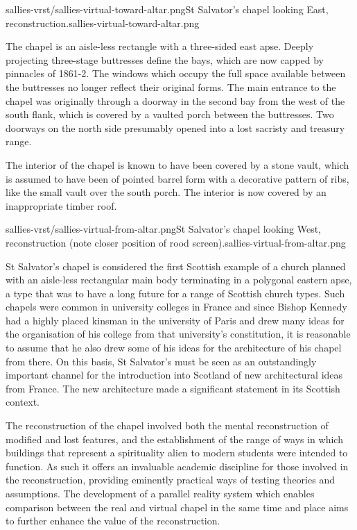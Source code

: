        {sallies-vrst/sallies-virtual-toward-altar.png}{St Salvator's chapel looking East, reconstruction.}{sallies-virtual-toward-altar.png}

The chapel is an aisle-less rectangle with a three-sided east apse. Deeply projecting three-stage buttresses define the bays, which are now capped by pinnacles of 1861-2. The windows which occupy the full space available between the buttresses no longer reflect their original forms. The main entrance to the chapel was originally through a doorway in the second bay from the west of the south flank, which is covered by a vaulted porch between the buttresses. Two doorways on the north side presumably opened into a lost sacristy and treasury range.

The interior of the chapel is known to have been covered by a stone vault, which is assumed to have been of pointed barrel form with a decorative pattern of ribs, like the small vault over the south porch. The interior is now covered by an inappropriate timber roof.

       {sallies-vrst/sallies-virtual-from-altar.png}{St Salvator's chapel looking West, reconstruction (note closer position of rood screen).}{sallies-virtual-from-altar.png}

St Salvator’s chapel is considered the first Scottish example of a church planned with an aisle-less rectangular main body terminating in a polygonal eastern apse, a type that was to have a long future for a range of Scottish church types. Such chapels were common in university colleges in France and since Bishop Kennedy had a highly placed kinsman in the university of Paris and drew many ideas for the organisation of his college from that university's constitution, it is reasonable to assume that he also drew some of his ideas for the architecture of his chapel from there. On this basis, St Salvator’s must be seen as an outstandingly important channel for the introduction into Scotland of new architectural ideas from France. The new architecture made a significant statement in its Scottish context. 

The reconstruction of the chapel involved both the mental reconstruction of modified and lost features, and the establishment of the range of ways in which buildings that represent a spirituality alien to modern students were intended to function. As such it offers an invaluable academic discipline for those involved in the reconstruction, providing eminently practical ways of testing theories and assumptions. The development of a parallel reality system which enables comparison between the real and virtual chapel in the same time and place aims to further enhance the value of the reconstruction.

